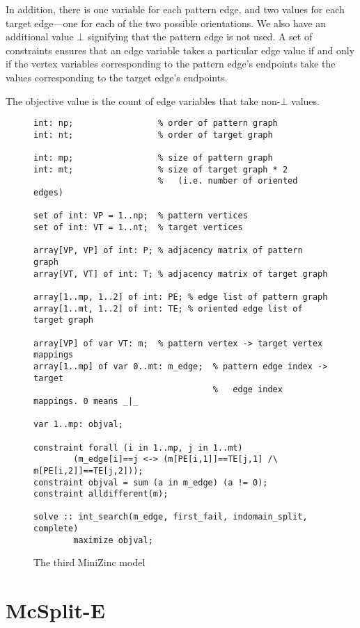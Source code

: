 In addition, there is one variable for each pattern edge, and two values for
each target edge---one for each of the two possible orientations.  We also have
an additional value $\bot$ signifying that the pattern edge is not used.  A set
of constraints ensures that an edge variable takes a particular edge value if
and only if the vertex variables corresponding to the pattern edge's endpoints
take the values corresponding to the target edge's endpoints.

The objective value is the count of edge variables that take non-$\bot$ values.


\begin{figure}
\vspace{.8em}
\footnotesize
\begin{verbatim}
int: np;                 % order of pattern graph
int: nt;                 % order of target graph

int: mp;                 % size of pattern graph
int: mt;                 % size of target graph * 2
                         %   (i.e. number of oriented edges)

set of int: VP = 1..np;  % pattern vertices
set of int: VT = 1..nt;  % target vertices

array[VP, VP] of int: P; % adjacency matrix of pattern graph
array[VT, VT] of int: T; % adjacency matrix of target graph

array[1..mp, 1..2] of int: PE; % edge list of pattern graph
array[1..mt, 1..2] of int: TE; % oriented edge list of target graph

array[VP] of var VT: m;  % pattern vertex -> target vertex mappings
array[1..mp] of var 0..mt: m_edge;  % pattern edge index -> target
                                    %   edge index mappings. 0 means _|_

var 1..mp: objval;

constraint forall (i in 1..mp, j in 1..mt)
        (m_edge[i]==j <-> (m[PE[i,1]]==TE[j,1] /\ m[PE[i,2]]==TE[j,2]));
constraint objval = sum (a in m_edge) (a != 0);
constraint alldifferent(m);

solve :: int_search(m_edge, first_fail, indomain_split, complete)
        maximize objval;
\end{verbatim}
\vspace{-1em}
\caption{The third MiniZinc model}\label{fig:model3}
\end{figure}

\section{McSplit-E}

